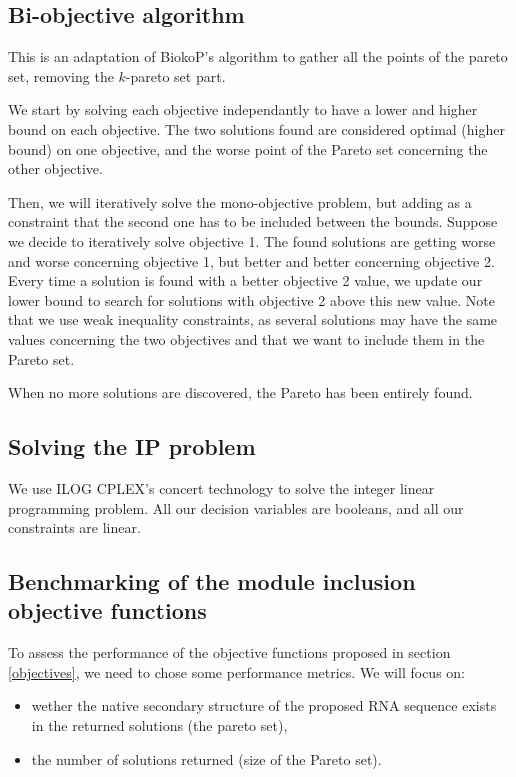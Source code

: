 \documentclass{article}
\begin{document}
\subsection{Bi-objective algorithm}
This is an adaptation of BiokoP's algorithm \cite{legendre_bi-objective_2018} to gather all the points of the pareto set, removing the $k$-pareto set part.

We start by solving each objective independantly to have a lower and higher bound on each objective. 
The two solutions found are considered optimal (higher bound) on one objective, and the worse point of the Pareto set concerning the other objective.

Then, we will iteratively solve the mono-objective problem, but adding as a constraint that the second one has to be included between the bounds.
Suppose we decide to iteratively solve objective 1. 
The found solutions are getting worse and worse concerning objective 1, but better and better concerning objective 2. 
Every time a solution is found with a better objective 2 value, we update our lower bound to search for solutions with objective 2 above this new value.
Note that we use weak inequality constraints, as several solutions may have the same values concerning the two objectives and that we want to include them in the Pareto set.

When no more solutions are discovered, the Pareto has been entirely found.

\subsection{Solving the IP problem}
We use ILOG CPLEX's \cite{cplex} concert technology to solve the integer linear programming problem. All our decision variables are booleans, and all our constraints are linear.

\subsection{Benchmarking of the module inclusion objective functions}
To assess the performance of the objective functions proposed in section \ref{objectives}, we need to chose some performance metrics.
We will focus on:
\begin{itemize}
	\item wether the native secondary structure of the proposed RNA sequence exists in the returned solutions (the pareto set),
	\item the number of solutions returned (size of the Pareto set).
\end{itemize}
\end{document}
